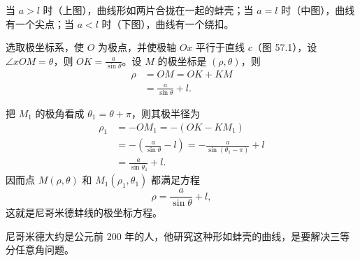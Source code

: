 \hfill
\begin{minipage}[c]{0.50\textwidth}
当 $a > l$ 时（上图），曲线形如两片合拢在一起的蚌壳；当 $a = l$ 时（中图），曲线有一个尖点；当 $a < l$ 时（下图），曲线有一个绕扣。

\hspace*{2em}选取极坐标系，使 $O$ 为极点，并使极轴 $Ox$ 平行于直线 $c$（图 57.1），设 $\angle xOM = \theta$，则 $OK = \frac{a}{\sin\theta}$。设 $M$ 的极坐标是 $(\rho,\theta)$，则
\begin{align*}
  \rho &= OM = OK + KM \\
       &= \frac{a}{\sin\theta} + l.
\end{align*}
\end{minipage}

把 $M_1$ 的极角看成 $\theta_1 = \theta + \pi$，则其极半径为
\begin{align*}
  \rho_1 &= -OM_1 = -(OK - KM_1) \\
         &= -\left(\frac{a}{\sin\theta} - l\right) = -\frac{a}{\sin(\theta_1 - \pi)} + l \\
         &= \frac{a}{\sin\theta_1} + l.
\end{align*}
因而点 $M(\rho,\theta)$ 和 $M_1(\rho_1,\theta_1)$ 都满足方程
\[
  \rho = \frac{a}{\sin\theta} + l,
\]
这就是尼哥米德蚌线的极坐标方程。

尼哥米德大约是公元前 200 年的人，他研究这种形如蚌壳的曲线，是要解决三等分任意角问题。

